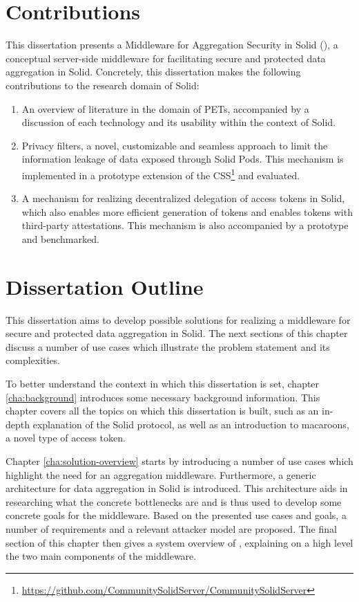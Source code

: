 \section{Contributions}
\label{sec:contributions}
This dissertation presents a Middleware for Aggregation Security in Solid (\middleware{}), a conceptual server-side middleware for facilitating secure and protected data aggregation in Solid. Concretely, this dissertation makes the following contributions to the research domain of Solid:
\begin{enumerate}
    \item An overview of literature in the domain of \acrlong{PETs}, accompanied by a discussion of each technology and its usability within the context of Solid.
    \newpage
    \item Privacy filters, a novel, customizable and seamless approach to limit the information leakage of data exposed through Solid Pods. This mechanism is implemented in a prototype extension of the \acrlong{CSS}\footnote{\url{https://github.com/CommunitySolidServer/CommunitySolidServer}} and evaluated.
    \item A mechanism for realizing decentralized delegation of access tokens in Solid, which also enables more efficient generation of tokens and enables tokens with third-party attestations. This mechanism is also accompanied by a prototype and benchmarked.
\end{enumerate}

\section{Dissertation Outline}
\label{sec:outline}
This dissertation aims to develop possible solutions for realizing a middleware for secure and protected data aggregation in Solid. The next sections of this chapter discuss a number of use cases which illustrate the problem statement and its complexities.

To better understand the context in which this dissertation is set, chapter \ref{cha:background} introduces some necessary background information. This chapter covers all the topics on which this dissertation is built, such as an in-depth explanation of the Solid protocol, as well as an introduction to macaroons, a novel type of access token. 

Chapter \ref{cha:solution-overview} starts by introducing a number of use cases which highlight the need for an aggregation middleware. Furthermore, a generic architecture for data aggregation in Solid is introduced. This architecture aids in researching what the concrete bottlenecks are and is thus used to develop some concrete goals for the middleware. Based on the presented use cases and goals, a number of requirements and a relevant attacker model are proposed. The final section of this chapter then gives a system overview of \middleware{}, explaining on a high level the two main components of the middleware.

